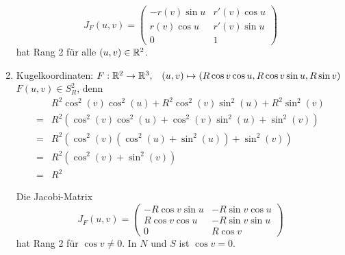 \begin{beispiel}
\begin{enumerate}[label=\arabic*)]
            \[J_F(u,v) = 
            \begin{pmatrix}
                -r(v) \sin u & r'(v) \cos u\\
                r(v) \cos u  & r'(v) \sin u\\
                 0           & 1
            \end{pmatrix}\]
            hat Rang 2 für alle $(u,v) \in \mathbb{R}^2$.
        \item Kugelkoordinaten: $F: \mathbb{R}^2 \rightarrow \mathbb{R}^3, \;\;\; (u, v) \mapsto (R \cos v \cos u, R \cos v \sin u, R \sin v)$
              $F(u,v) \in S_R^2$, denn 
                \begin{align*}
                    & R^2 \cos^2(v) \cos^2(u) + R^2 \cos^2(v) \sin^2(u) + R^2 \sin^2(v)\\
                    =& R^2 (\cos^2(v) \cos^2(u) + \cos^2(v) \sin^2(u) + \sin^2(v))\\
                    =& R^2 \left (\cos^2(v) (\cos^2(u) + \sin^2(u)) + \sin^2(v) \right)\\
                    =& R^2 \left (\cos^2(v) + \sin^2(v) \right)\\
                    =&R^2
                \end{align*}

                Die Jacobi-Matrix
                \[J_F(u,v) = 
                \begin{pmatrix}
                    -R \cos v \sin u & -R \sin v \cos u\\
                    R \cos v \cos u  & -R \sin v \sin u\\
                    0                & R \cos v
                \end{pmatrix}\]
                hat Rang 2 für $\cos v \neq 0$. In $N$ und $S$ ist
                $\cos v = 0$.
    \end{enumerate}
\end{beispiel}


